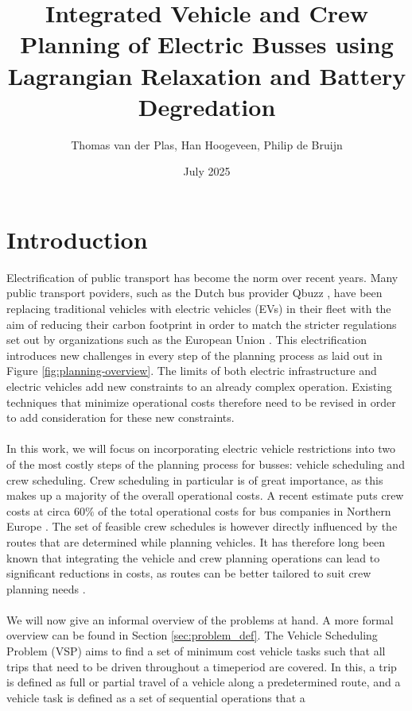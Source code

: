 \documentclass[ht]{article}
\title{Integrated Vehicle and Crew Planning of Electric Busses using Lagrangian Relaxation and Battery Degredation}
\date{July 2025}
\author{Thomas van der Plas, Han Hoogeveen, Philip de Bruijn}
\begin{document}
\maketitle

\section{Introduction}
Electrification of public transport has become the norm over recent years. Many
public transport poviders, such as the Dutch bus provider Qbuzz
\cite{qbuzzQbuzz}, have been replacing traditional vehicles with electric
vehicles (EVs) in their fleet with the aim of reducing their carbon footprint
in order to match the stricter regulations set out by organizations such as the
European Union \cite{europaRegulation20181999}. This electrification introduces
new challenges in every step of the planning process as laid out in Figure
\ref{fig:planning-overview}. The limits of both electric infrastructure and
electric vehicles add new constraints to an already complex operation. Existing
techniques that minimize operational costs therefore need to be revised in
order to add consideration for these new constraints. \\\\ In this work, we
will focus on incorporating electric vehicle restrictions into two of the most
costly steps of the planning process for busses: vehicle scheduling and crew
scheduling. Crew scheduling in particular is of great importance, as this makes
up a majority of the overall operational costs. A recent estimate puts crew
costs at circa $60\%$ of the total operational costs for bus companies in
Northern Europe \cite{Perumal2019Crew}. The set of feasible crew schedules is
however directly influenced by the routes that are determined while planning
vehicles. It has therefore long been known that integrating the vehicle and
crew planning operations can lead to significant reductions in costs, as routes
can be better tailored to suit crew planning needs \cite{Bodin1983}. \\\\ We
will now give an informal overview of the problems at hand. A more formal
overview can be found in Section \ref{sec:problem_def}. The Vehicle Scheduling
Problem (VSP) aims to find a set of minimum cost vehicle tasks such that all
trips that need to be driven throughout a timeperiod are covered. In this, a
trip is defined as full or partial travel of a vehicle along a predetermined
route, and a vehicle task is defined as a set of sequential operations that a
\end{document}
